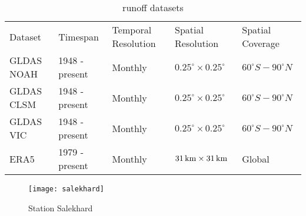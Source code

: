 \begin{table}[htbp]\centering
	\begin{tabular}{lllll}
		&                                     &                                          &                                         &                                       \\ \hline
		\multicolumn{1}{|l|}{Dataset}    & \multicolumn{1}{l|}{Timespan}       & \multicolumn{1}{l|}{Temporal Resolution} & \multicolumn{1}{l|}{Spatial Resolution} & \multicolumn{1}{l|}{Spatial Coverage} \\ \hline
		\multicolumn{1}{|l|}{GLDAS NOAH} & \multicolumn{1}{l|}{1948 - present} & \multicolumn{1}{l|}{Monthly}             & \multicolumn{1}{l|}{$0.25^{\circ} \times  0.25^{\circ}$}        & \multicolumn{1}{l|}{$60^{\circ}S - 90^{\circ}N$}      \\ \hline
		\multicolumn{1}{|l|}{GLDAS CLSM} & \multicolumn{1}{l|}{1948 - present} & \multicolumn{1}{l|}{Monthly}             & \multicolumn{1}{l|}{$0.25^{\circ} \times 0.25^{\circ}$}        & \multicolumn{1}{l|}{$60^{\circ}S - 90^{\circ}N$}      \\ \hline
		\multicolumn{1}{|l|}{GLDAS VIC}  & \multicolumn{1}{l|}{1948 - present} & \multicolumn{1}{l|}{Monthly}             & \multicolumn{1}{l|}{$0.25^{\circ} \times 0.25^{\circ}$}        & \multicolumn{1}{l|}{$60^{\circ}S - 90^{\circ}N$}      \\   \hline
		\multicolumn{1}{|l|}{ERA5}       & \multicolumn{1}{l|}{1979 - present} & \multicolumn{1}{l|}{Monthly}             & \multicolumn{1}{l|}{$31\,\mathrm{km} \times 31\,\mathrm{km}$}            & \multicolumn{1}{l|}{Global}           \\ \hline
	\end{tabular}
	\caption{runoff datasets}
	\label{tab:runoff}
\end{table}
\begin{figure}[htbp]
	\centering
	\texttt{[image: salekhard]} %
	\caption{Station Salekhard} 
	\label{fig:Salekhard}
\end{figure}
